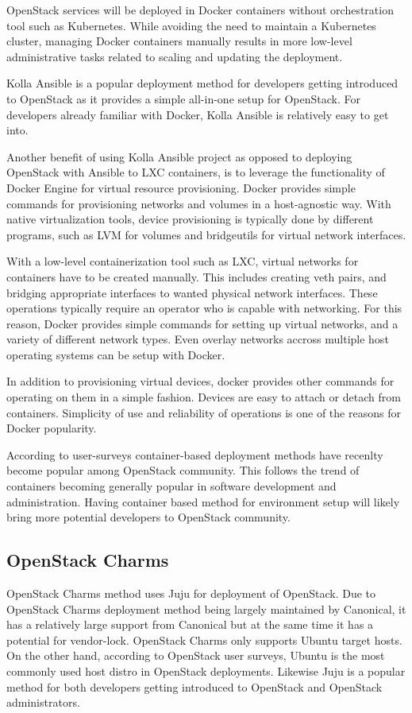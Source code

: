 \documentclass[officiallayout]{tktla}
\begin{document}
OpenStack services will be deployed in Docker containers without orchestration
tool such as Kubernetes. While avoiding the need to maintain a Kubernetes
cluster, managing Docker containers manually results in more low-level
administrative tasks related to scaling and updating the deployment.

Kolla Ansible is a popular deployment method for developers getting introduced
to OpenStack as it provides a simple all-in-one setup for OpenStack. For
developers already familiar with Docker, Kolla Ansible is relatively easy to
get into.

Another benefit of using Kolla Ansible project as opposed to deploying
OpenStack with Ansible to LXC containers, is to leverage the functionality of
Docker Engine for virtual resource provisioning. Docker provides simple
commands for provisioning networks and volumes in a host-agnostic way. With
native virtualization tools, device provisioning is typically done by different
programs, such as LVM for volumes and bridgeutils for virtual network
interfaces.

With a low-level containerization tool such as LXC, virtual networks for
containers have to be created manually. This includes creating veth pairs, and
bridging appropriate interfaces to wanted physical network interfaces. These
operations typically require an operator who is capable with networking. For
this reason, Docker provides simple commands for setting up virtual networks,
and a variety of different network types. Even overlay networks accross
multiple host operating systems can be setup with Docker.

In addition to provisioning virtual devices, docker provides other commands for
operating on them in a simple fashion. Devices are easy to attach or detach
from containers. Simplicity of use and reliability of operations is one of the
reasons for Docker popularity.

According to user-surveys container-based deployment methods have recenlty
become popular among OpenStack community. This follows the trend of containers
becoming generally popular in software development and administration. Having
container based method for environment setup will likely bring more potential
developers to OpenStack community.

\subsection{OpenStack Charms}

OpenStack Charms \cite{charm-deployment-guide} method uses Juju for deployment
of OpenStack. Due to OpenStack Charms deployment method being largely
maintained by Canonical, it has a relatively large support from Canonical but
at the same time it has a potential for vendor-lock. OpenStack Charms only
supports Ubuntu target hosts. On the other hand, according to OpenStack user
surveys, Ubuntu is the most commonly used host distro in OpenStack deployments.
Likewise Juju is a popular method for both developers getting introduced to
OpenStack and OpenStack administrators.
\end{document}
